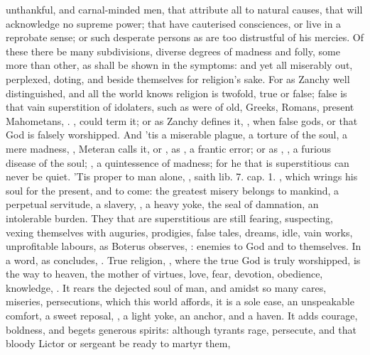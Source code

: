 {unthankful, and carnal-minded men, that attribute all to natural
causes, that will acknowledge no supreme power; that have cauterised
consciences, or live in a reprobate sense; or such desperate persons as
are too distrustful of his mercies. Of these there be many
subdivisions, diverse degrees of madness and folly, some more than
other, as shall be shown in the symptoms: and yet all miserably out,
perplexed, doting, and beside themselves for religion's sake. For as
Zanchy well distinguished, and all the world knows religion is
twofold, true or false; false is that vain superstition of idolaters,
such as were of old, Greeks, Romans, present Mahometans, \etc{}. , \Tully could term it; or as Zanchy defines it, , when false gods, or that God
is falsely worshipped. And 'tis a miserable plague, a torture of the
soul, a mere madness, , Meteran calls it, or
, as \Seneca, a frantic error; or as \Austin{}, , a furious disease of the soul; , a quintessence of madness; for he that is
superstitious can never be quiet. 'Tis proper to man alone, , saith \Pliny{} \textlatin{lib. 7. cap. 1.} , which wrings his soul for the present, and
to come: the greatest misery belongs to mankind, a perpetual servitude,
a slavery, , a heavy yoke, the seal of damnation,
an intolerable burden. They that are superstitious are still fearing,
suspecting, vexing themselves with auguries, prodigies, false tales,
dreams, idle, vain works, unprofitable labours, as Boterus
observes, : enemies to God and to
themselves. In a word, as \Seneca concludes, . True religion, , where the true God is
truly worshipped, is the way to heaven, the mother of virtues, love,
fear, devotion, obedience, knowledge, \etc{}. It rears the dejected soul of
man, and amidst so many cares, miseries, persecutions, which this world
affords, it is a sole ease, an unspeakable comfort, a sweet reposal,
, a light yoke, an anchor, and a haven. It adds
courage, boldness, and begets generous spirits: although tyrants rage,
persecute, and that bloody Lictor or sergeant be ready to martyr them,
}
